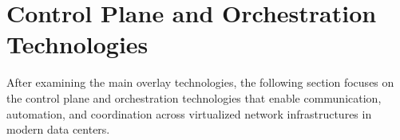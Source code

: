 \section{Control Plane and Orchestration Technologies}
After examining the main overlay technologies, the following section focuses on the control plane and orchestration technologies that enable communication, automation, and coordination across virtualized network infrastructures in modern data centers.